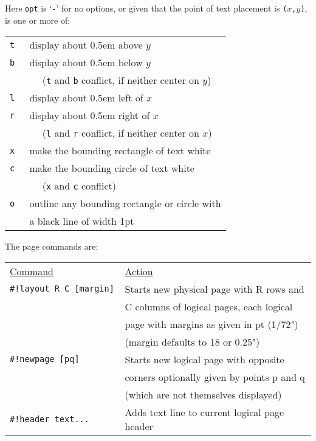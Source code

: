 \documentclass[12pt]{article}
\begin{document}
\begin{minipage}{\textwidth}
Here {\tt opt} is `{\tt -}' for no options, or given that the point
of text placement is {\tt ($x$,$y$)}, is one or more of:
\\[1ex]
\hspace*{0.5in}\begin{tabular}{rl}
    \tt t & display about 0.5em above $y$ \\
    \tt b & display about 0.5em below $y$ \\
          & ~~ ({\tt t} and {\tt b} conflict, if neither center on $y$) \\
    \tt l & display about 0.5em left of $x$ \\
    \tt r & display about 0.5em right of $x$ \\
          & ~~ ({\tt l} and {\tt r} conflict, if neither center on $x$) \\
    \tt x & make the bounding rectangle of text white \\
    \tt c & make the bounding circle of text white \\
          & ~~ ({\tt x} and {\tt c} conflict) \\
    \tt o & outline any bounding rectangle or circle with \\
          & a black line of width 1pt \\
    \end{tabular}
\end{minipage}


\begin{minipage}{\textwidth}
The page commands are:
\\[1ex]
\begin{tabular}{@{}l@{~~~~~}l@{}}
\underline{Command} & \underline{Action}
\\[1ex]
\tt \#!layout R C [margin]   & Starts new physical page with R rows and \\
                             & C columns of logical pages, each logical \\
			     & page with margins as given in pt (1/72") \\
			     & (margin defaults to 18 or 0.25") \\
\tt \#!newpage [pq] & Starts new logical page with opposite \\
                    & corners optionally given by points p and q \\
		    & (which are not themselves displayed) \\
\tt \#!header text... & Adds text line to current logical page header \\
\end{tabular}
\end{minipage}
\end{document}
